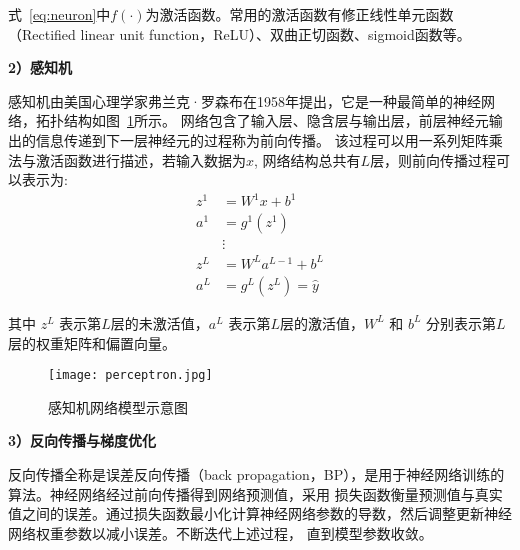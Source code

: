 式~\ref{eq:neuron}中$f(\cdot)$为激活函数。常用的激活函数有修正线性单元函数（Rectified linear unit function，ReLU）、双曲正切函数、sigmoid函数等。

\textbf{2）感知机}

感知机由美国心理学家弗兰克·罗森布\cite{1958perceptron}在1958年提出，它是一种最简单的神经网络，拓扑结构如图~\ref{fig:perceptron}所示。
网络包含了输入层、隐含层与输出层，前层神经元输出的信息传递到下一层神经元的过程称为前向传播。
该过程可以用一系列矩阵乘法与激活函数进行描述，若输入数据为$x$, 网络结构总共有$L$层，则前向传播过程可以表示为:
\begin{equation}
  \begin{aligned}
  z^{1} & =W^{1} x+b^{1} \\
  a^{1} & =g^{1}\left(z^{1}\right) \\
  & \vdots \\
  z^{L} & =W^{L} a^{L-1}+b^{L} \\
  a^{L} & =g^{L}\left(z^{L}\right)=\hat{y}
  \label{eq:perceptron}
\end{aligned}
\end{equation}

其中 $z^{L}$ 表示第$L$层的未激活值，$a^{L}$ 表示第$L$层的激活值，$W^{L}$ 和 $b^{L}$ 分别表示第$L$层的权重矩阵和偏置向量。
\begin{figure}[htbp]
  \centering
  \texttt{[image: perceptron.jpg]}
  \caption{感知机网络模型示意图}
  \label{fig:perceptron}
\end{figure}

\textbf{3）反向传播与梯度优化}

反向传播全称是误差反向传播（back propagation，BP），是用于神经网络训练的算法。神经网络经过前向传播得到网络预测值，采用
损失函数衡量预测值与真实值之间的误差。通过损失函数最小化计算神经网络参数的导数，然后调整更新神经网络权重参数以减小误差。不断迭代上述过程，
直到模型参数收敛。

